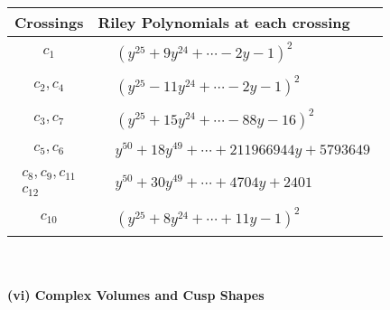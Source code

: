 \documentclass[1p]{elsarticle_modified}
\theoremstyle{definition}
\begin{document}
\begin{tabular}{m{50pt}|m{274pt}}
Crossings & \hspace{64pt}Riley Polynomials at each crossing \\
\hline $$\begin{aligned}c_{1}\end{aligned}$$&$\begin{aligned}
&(y^{25}+9 y^{24}+\cdots-2 y-1)^{2}
\end{aligned}$\\
\hline $$\begin{aligned}c_{2},c_{4}\end{aligned}$$&$\begin{aligned}
&(y^{25}-11 y^{24}+\cdots-2 y-1)^{2}
\end{aligned}$\\
\hline $$\begin{aligned}c_{3},c_{7}\end{aligned}$$&$\begin{aligned}
&(y^{25}+15 y^{24}+\cdots-88 y-16)^{2}
\end{aligned}$\\
\hline $$\begin{aligned}c_{5},c_{6}\end{aligned}$$&$\begin{aligned}
&y^{50}+18 y^{49}+\cdots+211966944 y+5793649
\end{aligned}$\\
\hline $$\begin{aligned}c_{8},c_{9},c_{11}\\c_{12}\end{aligned}$$&$\begin{aligned}
&y^{50}+30 y^{49}+\cdots+4704 y+2401
\end{aligned}$\\
\hline $$\begin{aligned}c_{10}\end{aligned}$$&$\begin{aligned}
&(y^{25}+8 y^{24}+\cdots+11 y-1)^{2}
\end{aligned}$\\
\hline
\end{tabular}\\~\\
\newpage\flushleft \textbf{(vi) Complex Volumes and Cusp Shapes}
\end{document}
